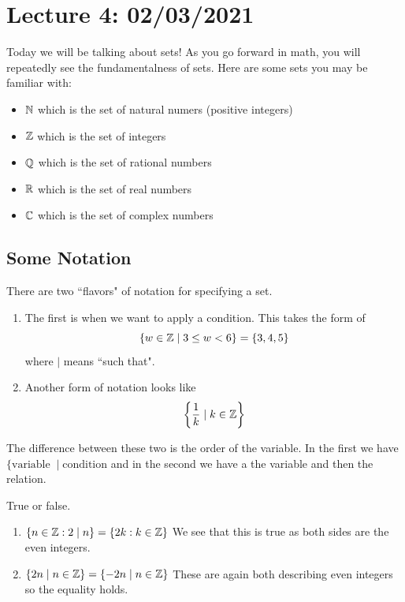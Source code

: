 \section{Lecture 4: 02/03/2021}
Today we will be talking about sets! As you go forward in math, you will repeatedly see the fundamentalness of sets. Here are some sets you may be familiar with:
\begin{itemize}
    \item $\mathbb{N}$ which is the set of natural numers (positive integers)
    \item $\mathbb{Z}$ which is the set of integers
    \item $\mathbb{Q}$ which is the set of rational numbers
    \item $\mathbb{R}$ which is the set of real numbers
    \item $\mathbb{C}$ which is the set of complex numbers
\end{itemize}
\subsection{Some Notation}
There are two ``flavors" of notation for specifying a set.
\begin{enumerate}
    \item The first is when we want to apply a condition. This takes the form of 
    $$
    \{w \in \mathbb{Z} \mid 3 \le w < 6 \} = \{3, 4, 5\}
    $$
    where $\mid$ means ``such that".
    \item Another form of notation looks like
    $$
    \left\{\frac{1}{k} \mid k \in \mathbb{Z}\right\}
    $$
\end{enumerate}
The difference between these two is the order of the variable. In the first we have $\{\text{variable} \; \mid \text{condition}$ and in the second we have a the variable and then the relation. 
\begin{example}
True or false. 
\begin{enumerate}
    \item $\{n \in \mathbb{Z} : 2 \mid n \} = \{2k : k \in \mathbb{Z} \}$ We see that this is true as both sides are the even integers.
    \item $\{2n \mid n \in \mathbb{Z}\} = \{-2n \mid n \in \mathbb{Z}\}$ These are again both describing even integers so the equality holds.
\end{enumerate}
\end{example}
